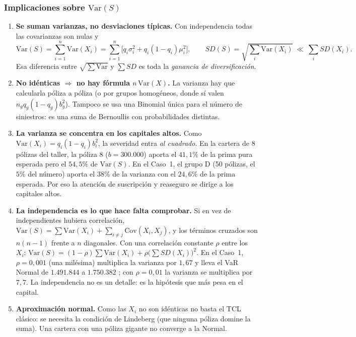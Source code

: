 \documentclass[a4paper,12pt]{article}
\newcommand{\euro}{\texteuro}
\newcommand{\Var}{\mathrm{Var}}
\newcommand{\Cov}{\mathrm{Cov}}
\begin{document}
\subsubsection*{Implicaciones sobre $\Var(S)$}
\begin{enumerate}[leftmargin=*]
\item \textbf{Se suman varianzas, no desviaciones t\'ipicas.} Con independencia todas las covarianzas son nulas y
\[
\Var(S)=\sum_{i=1}^n\Var(X_i)=\sum_{i=1}^n\Big[q_i\sigma_i^2+q_i(1-q_i)\mu_i^2\Big],\qquad SD(S)=\sqrt{\textstyle\sum_i\Var(X_i)}\ \ll\ \sum_i SD(X_i).
\]
Esa diferencia entre $\sqrt{\sum\Var}$ y $\sum SD$ es toda la \emph{ganancia de diversificaci\'on}.
\item \textbf{No id\'enticas $\Rightarrow$ no hay f\'ormula $n\,\Var(X)$.} La varianza hay que calcularla p\'oliza a p\'oliza (o por grupos homog\'eneos, donde s\'i valen $n_gq_g(1-q_g)b_g^2$). Tampoco se usa una Binomial \'unica para el n\'umero de siniestros: es una suma de Bernoullis con probabilidades distintas.
\item \textbf{La varianza se concentra en los capitales altos.} Como $\Var(X_i)=q_i(1-q_i)b_i^2$, la severidad entra \emph{al cuadrado}. En la cartera de 8 p\'olizas del taller, la p\'oliza 8 ($b=300.000$) aporta el $41{,}1\%$ de la prima pura esperada pero el $54{,}5\%$ de $\Var(S)$. En el Caso~1, el grupo D (50 p\'olizas, el $5\%$ del n\'umero) aporta el $38\%$ de la varianza con el $24{,}6\%$ de la prima esperada. Por eso la atenci\'on de suscripci\'on y reaseguro se dirige a los capitales altos.
\item \textbf{La independencia es lo que hace falta comprobar.} Si en vez de independientes hubiera correlaci\'on, $\Var(S)=\sum\Var(X_i)+\sum_{i\ne j}\Cov(X_i,X_j)$, y los t\'erminos cruzados son $n(n-1)$ frente a $n$ diagonales. Con una correlaci\'on constante $\rho$ entre los $X_i$: $\Var(S)=(1-\rho)\sum\Var(X_i)+\rho\big(\sum SD(X_i)\big)^2$. En el Caso~1, $\rho=0{,}001$ (una mil\'esima) multiplica la varianza por $1{,}67$ y lleva el VaR Normal de $1.491.844$ a $1.750.382$ \euro; con $\rho=0{,}01$ la varianza se multiplica por $7{,}7$. La independencia no es un detalle: es la hip\'otesis que m\'as pesa en el capital.
\item \textbf{Aproximaci\'on normal.} Como las $X_i$ no son id\'enticas no basta el TCL cl\'asico: se necesita la condici\'on de Lindeberg (que ninguna p\'oliza domine la suma). Una cartera con una p\'oliza gigante no converge a la Normal.
\end{enumerate}
\end{document}
